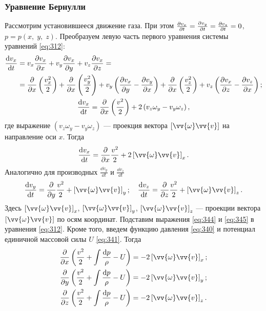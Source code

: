 	\subsubsection{Уравнение Бернулли}
	Рассмотрим установившееся движение газа. При этом $\frac{\partial v_x}{\partial t} = \frac{\partial v_y}{\partial t} = \frac{\partial v_z}{\partial t} = 0$, $p = p\left(x,\; y,\; z\right)$. Преобразуем левую часть первого уравнения системы уравнений \eqref{eq:312}:
	\begin{gather*}
		\begin{aligned}
			\frac{\mathrm{d} v_x}{\mathrm{d} t} &= v_x\frac{\partial v_x}{\partial x} + v_y\frac{\partial v_x}{\partial y} + v_z\frac{\partial v_x}{\partial z} =\\
			&= \frac{\partial}{\partial x}\left(\frac{v_x^2}{2}\right) + \frac{\partial}{\partial x}\left(\frac{v_y^2}{2}\right) + v_y\left(\frac{\partial v_x}{\partial y} - \frac{\partial v_y}{\partial x}\right) + \frac{\partial}{\partial x}\left(\frac{v_z^2}{2}\right) + v_z\left(\frac{\partial v_x}{\partial z} - \frac{\partial v_z}{\partial x}\right);
		\end{aligned}\\
		\frac{\mathrm{d} v_x}{\mathrm{d} t} = \frac{\partial}{\partial x}\left(\frac{v^2}{2}\right) + 2\left(v_z\omega_y - v_y\omega_z\right),
	\end{gather*}
	где выражение $\left(v_z\omega_y - v_y\omega_z\right)$ --- проекция вектора $\left[\vv{\omega}\vv{v}\right]$ на направление оси $x$.\n
	Тогда
	\begin{gather}\label{eq:344}
		\frac{\dd v_x}{\dd t} = \frac{\pp}{\pp x}\frac{v^2}{2} + 2\left[\vv{\omega}\vv{v}\right]_x.
	\end{gather}\n
	Аналогично для производных $\frac{\dd v_y}{\dd t}$ и $\frac{\dd v_z}{\dd t}$
	\begin{gather}\label{eq:345}
		\frac{\dd v_y}{\dd t} = \frac{\pp}{\pp y}\frac{v^2}{2} + \left[\vv{\omega}\vv{v}\right]_y;\quad
		\frac{\dd v_z}{\dd t} = \frac{\pp}{\pp z}\frac{v^2}{2} + \left[\vv{\omega}\vv{v}\right]_z.
	\end{gather}\n
	Здесь $\left[\vv{\omega}\vv{v}\right]_x$, $\left[\vv{\omega}\vv{v}\right]_y$, $\left[\vv{\omega}\vv{v}\right]_z$ --- проекции вектора $\left[\vv{\omega}\vv{v}\right]$ по осям координат.\n
	Подставим выражения \eqref{eq:344} и \eqref{eq:345} в уравнения \eqref{eq:312}. Кроме того, введем функцию давления \eqref{eq:340} и потенциал единичной массовой силы $U$ \eqref{eq:341}. Тогда
	\begin{gather*}
		\frac{\pp}{\pp x}\left(\frac{v^2}{2} + \int\frac{\dd p}{\rho} - U\right) = -2\left[\vv{\omega}\vv{v}\right]_x;\\
		\frac{\pp}{\pp y}\left(\frac{v^2}{2} + \int\frac{\dd p}{\rho} - U\right) = -2\left[\vv{\omega}\vv{v}\right]_y;\\
		\frac{\pp}{\pp z}\left(\frac{v^2}{2} + \int\frac{\dd p}{\rho} - U\right) = -2\left[\vv{\omega}\vv{v}\right]_z.
	\end{gather*}\n
